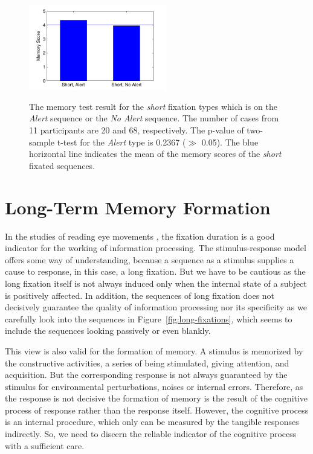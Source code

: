 \documentclass[10pt,letterpaper]{article}
\begin{document}
\begin{figure}
  \centerline{\includegraphics[width=60mm,height=44mm,trim=9mm 3mm 12mm 3mm]{./eps/memtest_short.pdf}}
  \caption{The memory test result for the \textit{short} fixation types which is on the \textit{Alert} sequence or the \textit{No Alert} sequence. The number of cases from 11 participants are 20 and 68, respectively. The p-value of two-sample t-test for the \textit{Alert} type is 0.2367 ($\gg$ 0.05). The blue horizontal line indicates the mean of the memory scores of the \textit{short} fixated sequences.}
  \label{fig:memtest-short}
\end{figure}


\section{Long-Term Memory Formation}

In the studies of reading eye movements \cite{Rayner1998}, the fixation duration is a good indicator for the working of information processing. The stimulus-response model offers some way of understanding, because a sequence as a stimulus supplies a cause to response, in this case, a long fixation. But we have to be cautious as the long fixation itself is not always induced only when the internal state of a subject is positively affected. In addition, the sequences of long fixation does not decisively guarantee the quality of information processing nor its specificity as we carefully look into the sequences in Figure~\ref{fig:long-fixations}, which seems to include the sequences looking passively or even blankly. 

This view is also valid for the formation of memory. A stimulus is memorized by the constructive activities, a series of being stimulated, giving attention, and acquisition. But the corresponding response is not always guaranteed by the stimulus for environmental perturbations, noises or internal errors. Therefore, as the response is not decisive the formation of memory is the result of the cognitive process of response rather than the response itself. However, the cognitive process is an internal procedure, which only can be measured by the tangible responses indirectly. So, we need to discern the reliable indicator of the cognitive process with a sufficient care. 
\end{document}

